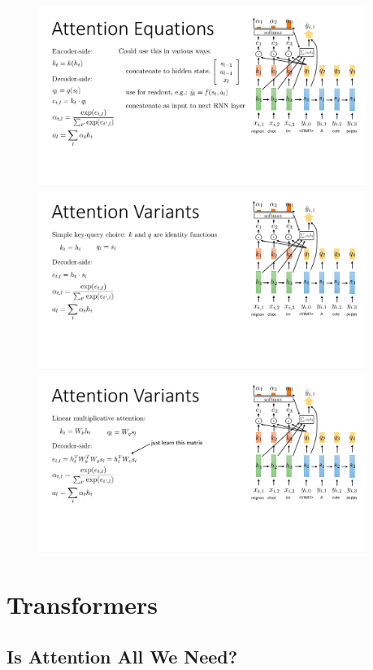 \documentclass{book}
\begin{document}
\begin{figure}[H]
    \centering
    \includegraphics[width=0.95\textwidth]{images/lec11_21.png}
    \includegraphics[width=0.95\textwidth]{images/lec11_22.png}
    \includegraphics[width=0.95\textwidth]{images/lec11_23.png}
\end{figure}
\chapter{Transformers}
\section{Is Attention All We Need?}
\end{document}
